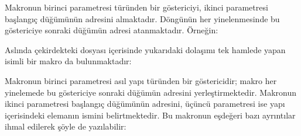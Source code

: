 \documentclass[a4paper,10pt,turkish]{sphinxmanual}
\begin{document}
\sphinxAtStartPar
Makronun birinci parametresi  türünden bir göstericiyi, ikinci parametresi başlangıç
düğümünün adresini almaktadır. Döngünün her yinelenmesinde bu göstericiye sonraki düğümün 
adresi atanmaktadır. Örneğin:

\begin{sphinxVerbatim}[commandchars=\\\{\}]

\end{sphinxVerbatim}

\sphinxAtStartPar
Aslında çekirdekteki  dosyası içerisinde yukarıdaki dolaşımı tek hamlede yapan
 isimli bir makro da bulunmaktadır:

\begin{sphinxVerbatim}[commandchars=\\\{\}]
\end{sphinxVerbatim}

\sphinxAtStartPar
Makronun birinci parametresi asıl yapı türünden bir göstericidir; makro her yinelemede bu göstericiye
sonraki düğümün adresini yerleştirmektedir. Makronun ikinci parametresi başlangıç düğümünün adresini,
üçüncü parametresi ise yapı içerisindeki  elemanın ismini belirtmektedir. Bu makronun
eşdeğeri bazı ayrıntılar ihmal edilerek şöyle de yazılabilir:
\end{document}
